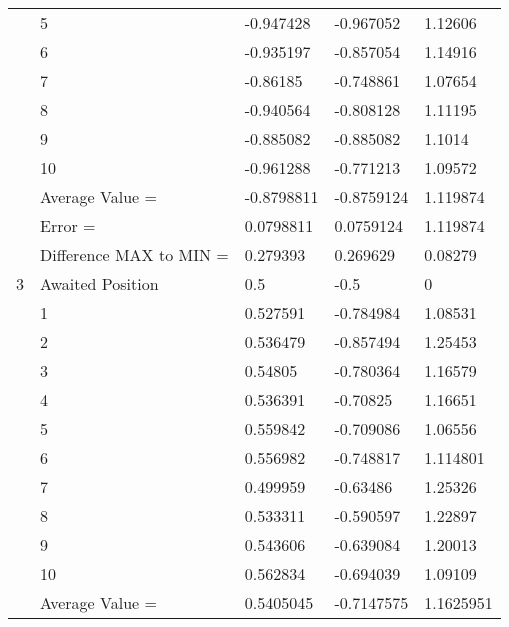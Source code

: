 \begin{tabular}{|p{2cm}|p{3cm}|p{3cm}|p{3cm}|p{3cm}|}
             & 5                       & -0.947428    & -0.967052    & 1.12606    \\
             & 6                       & -0.935197    & -0.857054    & 1.14916    \\
             & 7                       & -0.86185     & -0.748861    & 1.07654    \\
             & 8                       & -0.940564    & -0.808128    & 1.11195    \\
             & 9                       & -0.885082    & -0.885082    & 1.1014     \\
             & 10                      & -0.961288    & -0.771213    & 1.09572    \\
             & Average Value =         & -0.8798811   & -0.8759124   & 1.119874   \\
             & Error =                 & 0.0798811    & 0.0759124    & 1.119874   \\
             & Difference MAX to MIN = & 0.279393     & 0.269629     & 0.08279    \\
\hline
3            & Awaited Position        & 0.5          & -0.5         & 0          \\
             & 1                       & 0.527591     & -0.784984    & 1.08531    \\
             & 2                       & 0.536479     & -0.857494    & 1.25453    \\
             & 3                       & 0.54805      & -0.780364    & 1.16579    \\
             & 4                       & 0.536391     & -0.70825     & 1.16651    \\
             & 5                       & 0.559842     & -0.709086    & 1.06556    \\
             & 6                       & 0.556982     & -0.748817    & 1.114801   \\
             & 7                       & 0.499959     & -0.63486     & 1.25326    \\
             & 8                       & 0.533311     & -0.590597    & 1.22897    \\
             & 9                       & 0.543606     & -0.639084    & 1.20013    \\
             & 10                      & 0.562834     & -0.694039    & 1.09109    \\
             & Average Value =         & 0.5405045    & -0.7147575   & 1.1625951  \\

\end{tabular}
